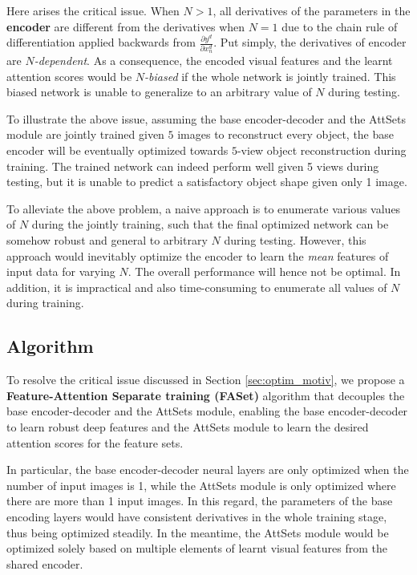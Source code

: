 \documentclass[twocolumn]{svjour3}    \pdfoutput=1
\newcommand{\nickname}{AttSets}
\newcommand{\rev}{}
\begin{document}
Here arises the critical issue. When $N>1$, all derivatives of the parameters in the \textbf{encoder} are different from the derivatives when $N=1$ due to the chain rule of differentiation applied backwards from $\frac{\partial y^d}{\partial x^d_n}$. \rev{Put simply, the derivatives of encoder are \textit{$N$-dependent}. As a consequence, the encoded visual features and the learnt attention scores would be \textit{$N$-biased} if the whole network is jointly trained. This biased network is unable to generalize to an arbitrary value of $N$ during testing.}

\rev{To illustrate the above issue, assuming the base encoder-decoder and the \nickname{} module are jointly trained given $5$ images to reconstruct every object, the base encoder will be eventually optimized towards $5$-view object reconstruction during training.} The trained network can indeed perform well given 5 views during testing, but it is unable to predict a satisfactory object shape given only 1 image.

To alleviate the above problem, a naive approach is to enumerate various values of $N$ during the jointly training, such that the final optimized network can be somehow robust and general to arbitrary $N$ during testing. However, this approach would inevitably optimize the encoder to learn the \textit{mean} features of input data for varying $N$. The overall performance will hence not be optimal. In addition, it is impractical and also time-consuming to enumerate all values of $N$ during training.

\vspace{-0.45cm}
\subsection{Algorithm}
To resolve the critical issue discussed in Section \ref{sec:optim_motiv}, we propose a \textbf{Feature-Attention Separate training (FASet)} algorithm that decouples the base encoder-decoder and the \nickname{} module, enabling the base encoder-decoder to learn robust deep features and the \nickname{} module to learn the desired attention scores for the feature sets.

In particular, the base encoder-decoder neural layers are only optimized when the number of input images is 1, while the \nickname{} module is only optimized where there are more than 1 input images. In this regard, the parameters of the base encoding layers would have consistent derivatives in the whole training stage, thus being optimized steadily. In the meantime, the \nickname{} module would be optimized solely based on multiple elements of learnt visual features from the shared encoder. 
\end{document}
